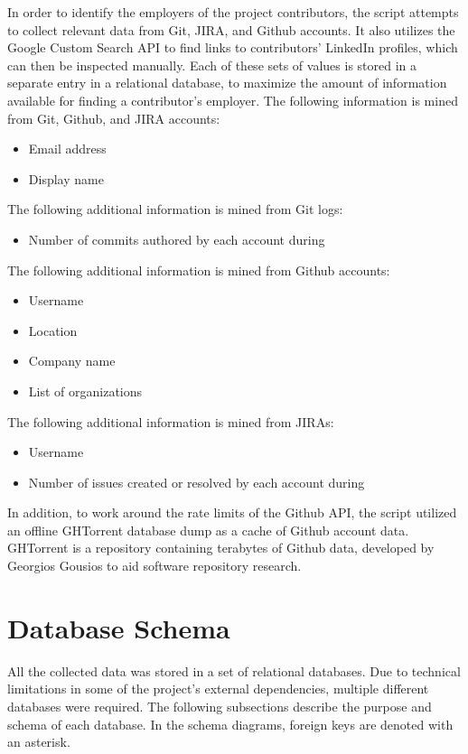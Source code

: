 In order to identify the employers of the project contributors, the script attempts to collect relevant data from Git, JIRA, and Github accounts. It also utilizes the Google Custom Search API to find links to contributors' LinkedIn profiles, which can then be inspected manually. Each of these sets of values is stored in a separate entry in a relational database, to maximize the amount of information available for finding a contributor's employer.
The following information is mined from Git, Github, and JIRA accounts:
\begin{itemize}
	\item Email address
	\item Display name
\end{itemize}
The following additional information is mined from Git logs:
\begin{itemize}
	\item Number of commits authored by each account during \timeperiod{}
\end{itemize}
The following additional information is mined from Github accounts:
\begin{itemize}
	\item Username
	\item Location
	\item Company name
	\item List of organizations
\end{itemize}
The following additional information is mined from JIRAs:
\begin{itemize}
	\item Username
	\item Number of issues created or resolved by each account during \timeperiod{}
\end{itemize}
In addition, to work around the rate limits of the Github API, the script utilized an offline GHTorrent database dump as a cache of Github account data. GHTorrent is a repository containing terabytes of Github data, developed by Georgios Gousios to aid software repository research\cite{Gousi13}.

 

\section{Database Schema}
All the collected data was stored in a set of relational databases. Due to technical limitations in some of the project's external dependencies, multiple different databases were required. The following subsections describe the purpose and schema of each database. In the schema diagrams, foreign keys are denoted with an asterisk.
